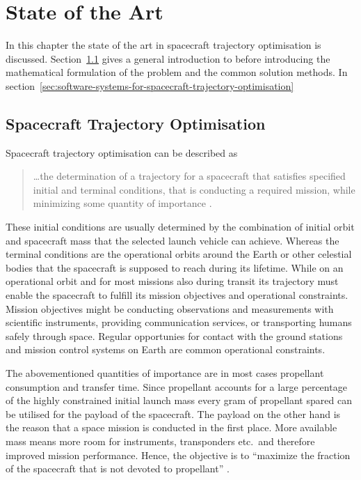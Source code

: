 \chapter{State of the Art}
\label{sec:state-of-the-art}

In this chapter the state of the art in spacecraft trajectory optimisation is discussed.
Section~\ref{sec:spacecraft-trajectory-optimisation} gives a general introduction to \sto before introducing the mathematical formulation of the \sto problem and the common solution methods.
In section~\ref{sec:software-systems-for-spacecraft-trajectory-optimisation} 

\section{Spacecraft Trajectory Optimisation}
\label{sec:spacecraft-trajectory-optimisation}
Spacecraft trajectory optimisation can be described as
\begin{quote}
    \ldots the determination of a trajectory for a spacecraft that satisfies specified initial and terminal conditions, that is conducting a required mission, while minimizing some quantity of importance \autocite[p. 1]{conway_problem_2014}.
\end{quote}

These initial conditions are usually determined by the combination of initial orbit and spacecraft mass that the selected launch vehicle can achieve.
Whereas the terminal conditions are the operational orbits around the Earth or other celestial bodies that the spacecraft is supposed to reach during its lifetime.
While on an operational orbit and for most missions also during transit its trajectory must enable the spacecraft to fulfill its mission objectives and operational constraints.
Mission objectives might be conducting observations and measurements with scientific instruments, providing communication services, or transporting humans safely through space.
Regular opportunies for contact with the ground stations and mission control systems on Earth are common operational constraints.

The abovementioned quantities of importance are in most cases propellant consumption and transfer time.
Since propellant accounts for a large percentage of the highly constrained initial launch mass every gram of propellant spared can be utilised for the payload of the spacecraft.
The payload on the other hand is the reason that a space mission is conducted in the first place.
More available mass means more room for instruments, transponders etc.\ and therefore improved mission performance.
Hence, the objective is to \enquote{maximize the fraction of the spacecraft that is not devoted to propellant} \autocite[p. 1]{conway_problem_2014}.

